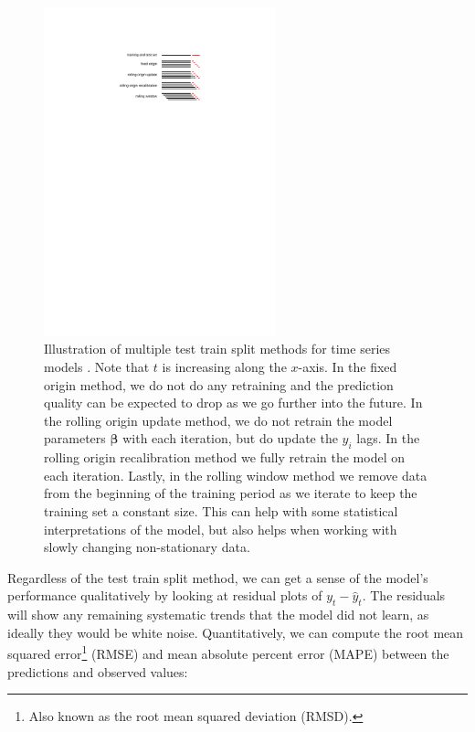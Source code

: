 \begin{figure}
\centering
\includegraphics[width=0.6\textwidth]{figures/stats/rolling_forecast_origin}
\caption{
Illustration of multiple test train split methods for time series models \cite{bergmeir_dissertation}.
Note that $t$ is increasing along the $x$-axis.
In the fixed origin method, we do not do any retraining and the prediction quality
can be expected to drop as we go further into the future.
In the rolling origin update method, we do not retrain the model parameters $\mathbf{\beta}$
with each iteration, but do update the $y_{i}$ lags.
In the rolling origin recalibration method we fully retrain the model on each iteration.
Lastly, in the rolling window method we remove data from the beginning of the training period
as we iterate to keep the training set a constant size.
This can help with some statistical interpretations of the model,
but also helps when working with slowly changing non-stationary data.
}
\label{fig:rolling_forecast_origin}
\end{figure}

Regardless of the test train split method, we can get a sense of the model's performance
qualitatively by looking at residual plots of $y_{t} - \hat{y}_{t}$.
The residuals will show any remaining systematic trends that the model did not learn,
as ideally they would be white noise.
Quantitatively, we can compute the
root mean squared error\footnote{Also known as the root mean squared deviation (RMSD).} (RMSE)
and mean absolute percent error (MAPE)
between the predictions and observed values:

